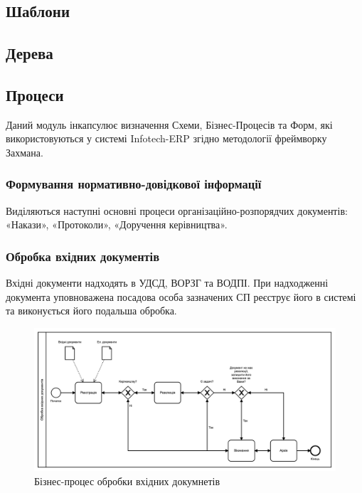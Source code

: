 \subsection{Шаблони}

\subsection{Дерева}

\newpage
\subsection{Процеси}

Даний модуль інкапсулює визначення Схеми, Бізнес-Процесів та Форм,
які використовуються у системі Infotech-ERP згідно методології фреймворку Захмана.

\subsubsection{Формування нормативно-довідкової інформації}

Виділяються наступні основні процеси організаційно-розпорядчих
документів: «Накази», «Протоколи», «Доручення керівництва».

\subsubsection{Обробка вхідних документів}

Вхідні документи надходять в УДСД, ВОРЗГ та ВОДПІ.
При надходженні документа уповноважена посадова особа зазначених
СП реєструє його в системі та виконується його подальша обробка.

\begin{figure}[!htbp]
\centerline{\includegraphics[scale=0.25]{handleInputDoc.png}}
\caption{Бізнес-процес обробки вхідних докумнетів}
\end{figure}

